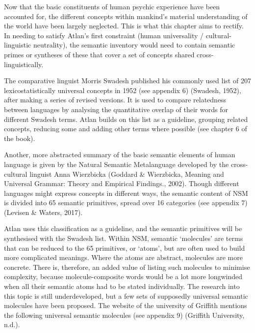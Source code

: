 Now that the basic constituents of human psychic experience have been accounted for, the different concepts within mankind’s material understanding of the world have been largely neglected. This is what this chapter aims to rectify. In needing to satisfy Atlan’s first constraint (human universality / cultural-linguistic neutrality), the semantic inventory would need to contain semantic primes or syntheses of these that cover a set of concepts shared cross-linguistically.  

The comparative linguist Morris Swadesh published his commonly used list of 207 lexicostatistically universal concepts in 1952 (see appendix 6) (Swadesh, 1952), after making a series of revised versions. It is used to compare relatedness between languages by analysing the quantitative overlap of their words for different Swadesh terms. Atlan builds on this list as a guideline, grouping related concepts, reducing some and adding other terms where possible (see chapter 6 of the book). 

Another, more abstracted summary of the basic semantic elements of human language is given by the Natural Semantic Metalanguage developed by the cross-cultural linguist Anna Wierzbicka (Goddard \& Wierzbicka, Meaning and Universal Grammar: Theory and Empirical Findings., 2002). Though different languages might express concepts in different ways, the semantic content of NSM is divided into 65 semantic primitives, spread over 16 categories (see appendix 7) (Levisen \& Waters, 2017). 

Atlan uses this classification as a guideline, and the semantic primitives will be synthesised with the Swadesh list. Within NSM, semantic ‘molecules’ are terms that can be reduced to the 65 primitives, or ‘atoms’, but are often used to build more complicated meanings. Where the atoms are abstract, molecules are more concrete. There is, therefore, an added value of listing such molecules to minimise complexity, because molecule-composite words would be a lot more longwinded when all their semantic atoms had to be stated individually. The research into this topic is still underdeveloped, but a few sets of supposedly universal semantic molecules have been proposed. The website of the university of Griffith mentions the following universal semantic molecules (see appendix 9) (Griffith University, n.d.).  


